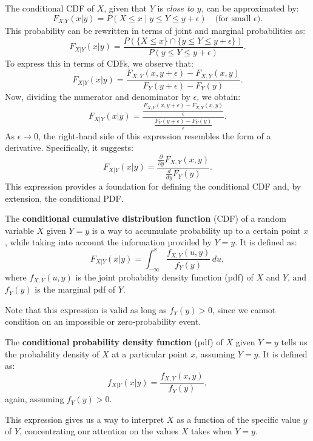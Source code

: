 The conditional CDF of \( X \), given that \( Y \) is \textit{close to \( y \),} can be approximated by:
\[
F_{X|Y}(x | y) = P(X \leq x \mid y \leq Y \leq y + \epsilon) \quad \text{(for small } \epsilon \text{)}.
\]
This probability can be rewritten in terms of joint and marginal probabilities as:
\[
F_{X|Y}(x | y) = \frac{P(\{ X \leq x \} \cap \{ y \leq Y \leq y + \epsilon \})}{P(y \leq Y \leq y + \epsilon)}.
\]
To express this in terms of CDFs, we observe that:
\[
F_{X|Y}(x | y) = \frac{F_{X,Y}(x, y + \epsilon) - F_{X,Y}(x, y)}{F_{Y}(y + \epsilon) - F_{Y}(y)}.
\]
Now, dividing the numerator and denominator by \( \epsilon \), we obtain:
\[
F_{X|Y}(x | y) = \frac{\frac{F_{X,Y}(x, y + \epsilon) - F_{X,Y}(x, y)}{\epsilon}}{\frac{F_{Y}(y + \epsilon) - F_{Y}(y)}{\epsilon}}.
\]
As \( \epsilon \to 0 \), the right-hand side of this expression resembles the form of a derivative. Specifically, it suggests:
\[
F_{X|Y}(x | y) = \frac{\frac{\partial}{\partial y} F_{X,Y}(x, y)}{\frac{d}{d y} F_{Y}(y)}.
\]
This expression provides a foundation for defining the conditional CDF and, by extension, the conditional PDF.


\begin{definition}
    The \textbf{conditional cumulative distribution function} (CDF) of a random variable \( X \) given \( Y = y \) is a way to accumulate probability up to a certain point \( x \), while taking into account the information provided by \( Y = y \). It is defined as:
   \[
   F_{X|Y}(x | y) = \int_{-\infty}^{x} \frac{f_{X,Y}(u, y)}{f_Y(y)} \, du,
   \]
   where \( f_{X,Y}(u, y) \) is the joint probability density function (pdf) of \( X \) and \( Y \), and \( f_Y(y) \) is the marginal pdf of \( Y \). 
\end{definition}

Note that this expression is valid as long as \( f_Y(y) > 0 \), since we cannot condition on an impossible or zero-probability event.

\begin{definition}
    The \textbf{conditional probability density function} (pdf) of \( X \) given \( Y = y \) tells us the probability density of \( X \) at a particular point \( x \), assuming \( Y = y \). It is defined as:
    \[
    f_{X|Y}(x | y) = \frac{f_{X,Y}(x, y)}{f_Y(y)},
    \]
    again, assuming \( f_Y(y) > 0 \).
\end{definition}

This expression gives us a way to interpret \( X \) as a function of the specific value \( y \) of \( Y \), concentrating our attention on the values \( X \) takes when \( Y = y \).

